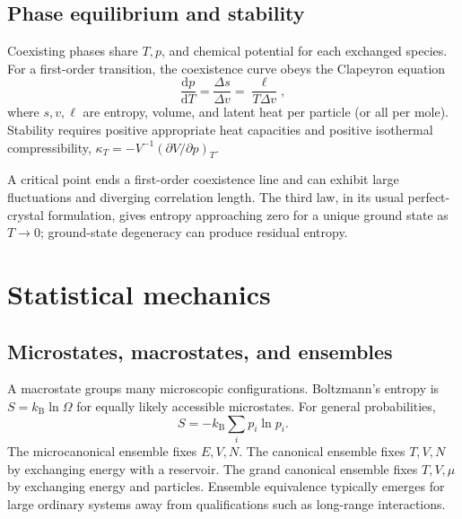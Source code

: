 \documentclass[11pt,oneside]{book}
\newcommand{\dd}{\mathrm{d}}
\newcommand{\od}[2]{\frac{\dd #1}{\dd #2}}
\newcommand{\kb}{k_{\mathrm B}}
\theoremstyle{reviewstyle}
\begin{document}
\section{Phase equilibrium and stability}
Coexisting phases share $T,p$, and chemical potential for each exchanged species. For a first-order transition, the coexistence curve obeys the Clapeyron equation
\begin{equation}\od{p}{T}=\frac{\Delta s}{\Delta v}=\frac{\ell}{T\Delta v},\end{equation}
where $s,v,\ell$ are entropy, volume, and latent heat per particle (or all per mole). Stability requires positive appropriate heat capacities and positive isothermal compressibility,
$\kappa_T=-V^{-1}(\partial V/\partial p)_T$.

A critical point ends a first-order coexistence line and can exhibit large fluctuations and diverging correlation length. The third law, in its usual perfect-crystal formulation, gives entropy approaching zero for a unique ground state as $T\to0$; ground-state degeneracy can produce residual entropy.

\chapter{Statistical mechanics}
\section{Microstates, macrostates, and ensembles}
A macrostate groups many microscopic configurations. Boltzmann's entropy is $S=\kb\ln\Omega$ for equally likely accessible microstates. For general probabilities,
\begin{equation}S=-\kb\sum_i p_i\ln p_i.\end{equation}
The microcanonical ensemble fixes $E,V,N$. The canonical ensemble fixes $T,V,N$ by exchanging energy with a reservoir. The grand canonical ensemble fixes $T,V,\mu$ by exchanging energy and particles. Ensemble equivalence typically emerges for large ordinary systems away from qualifications such as long-range interactions.
\end{document}
